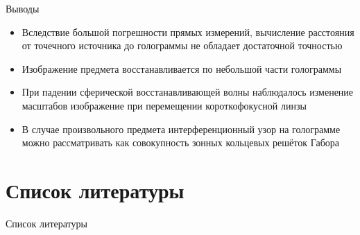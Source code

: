 \documentclass[11pt]{beamer} %
\begin{document}
    \begin{frame}{Выводы}
        \begin{itemize}
            \item Вследствие большой погрешности прямых измерений, вычисление расстояния от точечного источника до голограммы не обладает достаточной точностью
            \item Изображение предмета восстанавливается по небольшой части голограммы
            \item При падении сферической восстанавливающей волны наблюдалось изменение масштабов изображение при перемещении короткофокусной линзы
            \item В случае произвольного предмета интерференционный узор на голограмме можно рассматривать как совокупность зонных кольцевых решёток Габора
        \end{itemize}
    \end{frame}

    \section{Список литературы}
    \begin{frame}{Список литературы}
        \printbibliography
    \end{frame}
    
\end{document}
